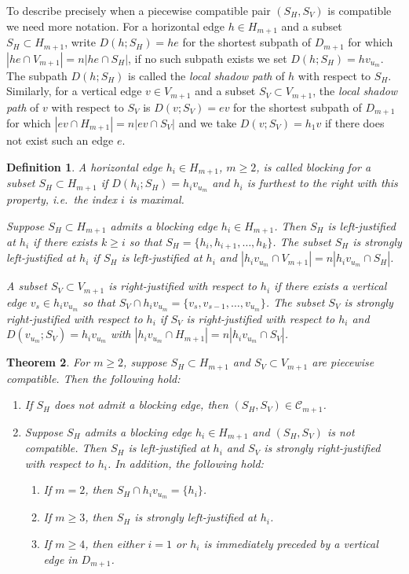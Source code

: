 \documentclass{amsart}
\newtheorem{theorem}{Theorem}[section]
\newtheorem{definition}[theorem]{Definition}
\numberwithin{equation}{section}
\newcommand{\cC}{\mathcal{C}}
\begin{document}
To describe precisely when a piecewise compatible pair $(S_H,S_V)$ is compatible we need more notation.
For a horizontal edge $h\in H_{m+1}$ and a subset $S_H\subset H_{m+1}$, write $D(h;S_H)=he$ for the shortest subpath of $D_{m+1}$ for which $|he\cap V_{m+1}|=n|he\cap S_H|$, if no such subpath exists we set $D(h;S_H)=hv_{u_m}$.
The subpath $D(h;S_H)$ is called the \emph{local shadow path} of $h$ with respect to $S_H$.
Similarly, for a vertical edge $v\in V_{m+1}$ and a subset $S_V\subset V_{m+1}$, the \emph{local shadow path} of $v$ with respect to $S_V$ is $D(v;S_V)=ev$ for the shortest subpath of $D_{m+1}$ for which $|ev\cap H_{m+1}|=n|ev\cap S_V|$ and we take $D(v;S_V)=h_1v$ if there does not exist such an edge $e$.
\begin{definition}
  \cite[Definition 3.17]{rupel}
  A horizontal edge $h_i\in H_{m+1}$, $m\ge2$, is called \emph{blocking} for a subset $S_H\subset H_{m+1}$ if $D(h_i;S_H)=h_iv_{u_m}$ and $h_i$ is furthest to the right with this property, i.e.\ the index $i$ is maximal. 

  Suppose $S_H\subset H_{m+1}$ admits a blocking edge $h_i\in H_{m+1}$.
  Then $S_H$ is \emph{left-justified at $h_i$} if there exists $k\ge i$ so that $S_H=\{h_i,h_{i+1},\ldots,h_k\}$.
  The subset $S_H$ is \emph{strongly left-justified at $h_i$} if $S_H$ is left-justified at $h_i$ and $|h_iv_{u_m}\cap V_{m+1}|=n|h_iv_{u_m}\cap S_H|$.

  A subset $S_V\subset V_{m+1}$ is \emph{right-justified with respect to $h_i$} if there exists a vertical edge $v_s\in h_iv_{u_m}$ so that $S_V\cap h_iv_{u_m}=\{v_s,v_{s-1},\ldots,v_{u_m}\}$.
  The subset $S_V$ is \emph{strongly right-justified with respect to $h_i$} if $S_V$ is right-justified with respect to $h_i$ and $D(v_{u_m};S_V)=h_iv_{u_m}$ with $|h_iv_{u_m}\cap H_{m+1}|=n|h_iv_{u_m}\cap S_V|$.
\end{definition}

\begin{theorem}
  \cite[Theorem 3.20 and Corollary 3.22]{rupel}
  \label{th:blocking edge conditions}
  For $m\ge2$, suppose $S_H\subset H_{m+1}$ and $S_V\subset V_{m+1}$ are piecewise compatible. 
  Then the following hold:
  \begin{enumerate}
    \item If $S_H$ does not admit a blocking edge, then $(S_H,S_V)\in\cC_{m+1}$.
    \item Suppose $S_H$ admits a blocking edge $h_i\in H_{m+1}$ and $(S_H,S_V)$ is not compatible.
      Then $S_H$ is left-justified at $h_i$ and $S_V$ is strongly right-justified with respect to $h_i$.
      In addition, the following hold:
      \begin{enumerate}
        \item If $m=2$, then $S_H\cap h_iv_{u_m}=\{h_i\}$.
        \item If $m\ge3$, then $S_H$ is strongly left-justified at $h_i$.
        \item If $m\ge4$, then either $i=1$ or $h_i$ is immediately preceded by a vertical edge in $D_{m+1}$.
      \end{enumerate}
  \end{enumerate}
\end{theorem}
\end{document}
